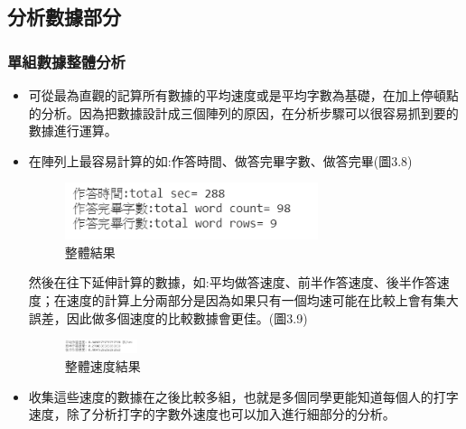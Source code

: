 \subsection{分析數據部分}
\subsubsection{單組數據整體分析}
\begin{itemize}
	\item 可從最為直觀的記算所有數據的平均速度或是平均字數為基礎，在加上停頓點的分析。因為把數據設計成三個陣列的原因，在分析步驟可以很容易抓到要的數據進行運算。
	\item 在陣列上最容易計算的如:作答時間、做答完畢字數、做答完畢(圖3.8)
	\begin{figure}[H] 
		\centering 
		\includegraphics[width=0.7\textwidth]{3_8.png} 
		\caption{整體結果} 
		\label{Fig.3.8} 
	\end{figure}
	然後在往下延伸計算的數據，如:平均做答速度、前半作答速度、後半作答速度；在速度的計算上分兩部分是因為如果只有一個均速可能在比較上會有集大誤差，因此做多個速度的比較數據會更佳。(圖3.9)
	\begin{figure}[H] 
		\centering 
		\includegraphics[width=0.2\textwidth]{3_9.png} 
		\caption{整體速度結果} 
		\label{Fig.3.8} 
	\end{figure}
	\item 收集這些速度的數據在之後比較多組，也就是多個同學更能知道每個人的打字速度，除了分析打字的字數外速度也可以加入進行細部分的分析。
\end{itemize}

